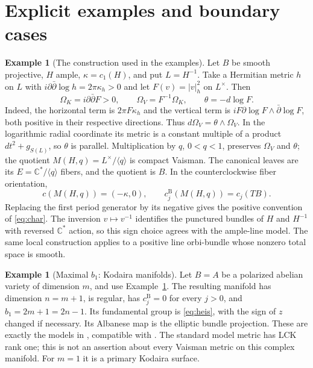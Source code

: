 \documentclass[12pt]{amsart}
\theoremstyle{definition}
\newtheorem{eg}[thm]{Example}
\theoremstyle{remark}
\numberwithin{equation}{section}
\newcommand{\C}{\mathbb{C}}
\newcommand{\bas}{\mathrm{B}}
\begin{document}
\section{Explicit examples and boundary cases}\label{sec:examples}
\begin{eg}[The construction used in the examples]\label{eg:construction}
Let $B$ be smooth projective, $H$ ample, $\kappa=c_1(H)$, and put
$L=H^{-1}$. Take a Hermitian metric $h$ on $L$ with
$i\partial\bar\partial\log h=2\pi\kappa_h>0$ and let
$F(v)=|v|_h^2$ on $L^{\times}$. Then
\begin{equation}\label{eq:cone}
\Omega_K=i\partial\bar\partial F>0,\qquad
\Omega_V=F^{-1}\Omega_K,\qquad\theta=-d\log F.
\end{equation}
Indeed, the horizontal term is $2\pi F\kappa_h$ and the vertical
term is $iF\partial\log F\wedge\bar\partial\log F$, both positive
in their respective directions. Thus $d\Omega_V=\theta\wedge\Omega_V$.
In the logarithmic radial coordinate its metric is a constant multiple
of a product $dt^2+g_{S(L)}$, so $\theta$ is parallel. Multiplication
by $q$, $0<q<1$, preserves $\Omega_V$ and $\theta$; the quotient
$M(H,q)=L^{\times}/\langle q\rangle$ is compact Vaisman.
The canonical leaves are its $E=\C^*/\langle q\rangle$ fibers,
and the quotient is $B$. In the counterclockwise fiber orientation,
\begin{equation}\label{eq:exchar}
c(M(H,q))=(-\kappa,0),\qquad
c_j^{\bas}(M(H,q))=c_j(TB).
\end{equation}
Replacing the first period generator by its negative gives the positive
convention of \eqref{eq:char}. The inversion $v\mapsto v^{-1}$
identifies the punctured bundles of $H$ and $H^{-1}$ with reversed
$\C^*$ action, so this sign choice agrees with the ample-line model.
The same local construction applies to a positive line orbi-bundle
whose nonzero total space is smooth.
\end{eg}

\begin{eg}[Maximal $b_1$: Kodaira manifolds]\label{eg:torus}
Let $B=A$ be a polarized abelian variety of dimension $m$, and use
Example~\ref{eg:construction}. The resulting manifold has dimension
$n=m+1$, is regular, has $c_j^{\bas}=0$ for every $j>0$, and
$b_1=2m+1=2n-1$. Its fundamental group is \eqref{eq:heis}, with
the sign of $z$ changed if necessary. Its Albanese map is the elliptic
bundle projection. These are exactly the models in
\cite[Example 7.2, Corollary 5.11]{Istrati}, compatible with
\cite[Theorem 6.6]{Gomes}. The standard model metric has LCK rank one;
this is not an assertion about every Vaisman metric on this complex
manifold. For $m=1$ it is a primary Kodaira surface.
\end{eg}
\end{document}
